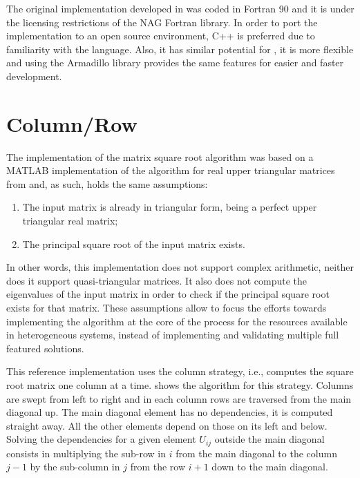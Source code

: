 \documentclass[../thesis]{subfiles}
\begin{document}
	The original implementation developed in \cite{Deadman:Higham:Ralha:2013} was coded in Fortran 90 and it is under the licensing restrictions of the NAG Fortran library. In order to port the implementation to an open source environment, C++ is preferred due to familiarity with the language. Also, it has similar potential for \hpc, it is more flexible and using the Armadillo library provides the same features for easier and faster development.

	\section{Column/Row}
	The implementation of the matrix square root algorithm was based on a MATLAB implementation of the algorithm for real upper triangular matrices from \cite{Deadman:Higham:Ralha:2013} and, as such, holds the same assumptions:
		\begin{enumerate}
			\item The input matrix is already in triangular form, being a perfect upper triangular real matrix;
			\item The principal square root of the input matrix exists.
		\end{enumerate}
	In other words, this implementation does not support complex arithmetic, neither does it support quasi-triangular matrices. It also does not compute the eigenvalues of the input matrix in order to check if the principal square root exists for that matrix. These assumptions allow to focus the efforts towards implementing the algorithm at the core of the process for the resources available in heterogeneous systems, instead of implementing and validating multiple full featured solutions.

	This reference implementation uses the column strategy, i.e., computes the square root matrix one column at a time.  shows the algorithm for this strategy. Columns are swept from left to right and in each column rows are traversed from the main diagonal up. The main diagonal element has no dependencies, it is computed straight away. All the other elements depend on those on its left and below. Solving the dependencies for a given element $U_{ij}$ outside the main diagonal consists in multiplying the sub-row in $i$ from the main diagonal to the column $j-1$ by the sub-column in $j$ from the row $i+1$ down to the main diagonal.
\end{document}
